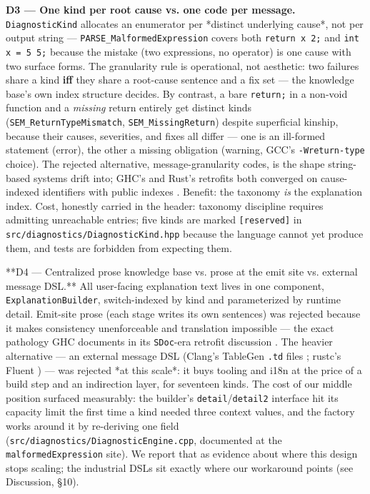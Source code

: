 \textbf{D3 --- One kind per root cause vs. one code per message.}
\texttt{DiagnosticKind} allocates an enumerator per *distinct underlying
cause*, not per output string --- \texttt{PARSE\_MalformedExpression} covers
both \texttt{return x 2;} and \texttt{int x = 5 5;} because the mistake (two
expressions, no operator) is one cause with two surface forms. The
granularity rule is operational, not aesthetic: two failures share a
kind \textbf{iff} they share a root-cause sentence and a fix set --- the
knowledge base's own index structure decides. By contrast, a bare
\texttt{return;} in a non-void function and a \emph{missing} return entirely get
distinct kinds (\texttt{SEM\_ReturnTypeMismatch}, \texttt{SEM\_MissingReturn})
despite superficial kinship, because their causes, severities, and
fixes all differ --- one is an ill-formed statement (error), the other
a missing obligation (warning, GCC's \texttt{-Wreturn-type} choice). The
rejected alternative, message-granularity codes, is the shape
string-based systems drift into; GHC's and Rust's retrofits both
converged on cause-indexed identifiers with public indexes
\cite{haskell-error-index,ghc-structured-errors,rust-rfc1644}. Benefit: the
taxonomy \emph{is} the explanation index. Cost, honestly carried in the
header: taxonomy discipline requires admitting unreachable entries;
five kinds are marked \texttt{[reserved]} in
\texttt{src/diagnostics/DiagnosticKind.hpp} because the language cannot yet
produce them, and tests are forbidden from expecting them.

**D4 --- Centralized prose knowledge base vs. prose at the emit site
vs. external message DSL.** All user-facing explanation text lives in
one component, \texttt{ExplanationBuilder}, switch-indexed by kind and
parameterized by runtime detail. Emit-site prose (each stage writes
its own sentences) was rejected because it makes consistency
unenforceable and translation impossible --- the exact pathology GHC
documents in its \texttt{SDoc}-era retrofit discussion \cite{welltyped2021ghc,ghc-structured-errors}. The heavier
alternative --- an external message DSL (Clang's TableGen \texttt{.td} files
\cite{clang-internals}; rustc's Fluent \cite{rustc-dev-guide}) --- was rejected *at this
scale*: it buys tooling and i18n at the price of a build step
and an indirection layer, for seventeen kinds. The cost of our middle
position surfaced measurably: the builder's \texttt{detail}/\texttt{detail2}
interface hit its capacity limit the first time a kind needed three
context values, and the factory works around it by re-deriving one
field (\texttt{src/diagnostics/DiagnosticEngine.cpp}, documented at the
\texttt{malformedExpression} site). We report that as evidence about where
this design stops scaling; the industrial DSLs sit exactly where our
workaround points (see Discussion, \S10).

